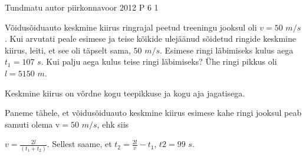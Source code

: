 {Tundmatu autor} %
{piirkonnavoor} %
{2012} %
{P 6} %
{1} %
{
\ifStatement
Võidusõiduauto keskmine kiirus ringrajal peetud treeningu jooksul oli $v = 50$ $m/s$. Kui arvutati peale esimese ja teise kõikide ulejäänud sõidetud ringide keskmine kiirus, leiti, et see oli täpselt sama, $50$ $m/s$. Esimese ringi läbimiseks kulus aega $t_1 = 107$ $s$. Kui palju aega kulus teise ringi läbimiseks? Ühe ringi pikkus oli $l = 5150$ $m$.
\fi

\ifHint
Keskmine kiirus on võrdne kogu teepikkuse ja kogu aja jagatisega.
\fi

\ifSolution
Paneme tähele, et võidusõiduauto keskmine kiirus esimese kahe ringi jooksul peab samuti olema v$ = 50$ $m/s$, ehk siis 
\begin{center}
$v = \frac{2l}{(t_1 + t_2)}$. Sellest saame, et $t_2 = \frac{2l}{v} - t_1 $, $t2 = 99$ $s$.
\end{center}
\fi
}
